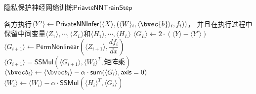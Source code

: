 %
\begin{algorithm}[h!]
\caption{隐私保护神经网络训练$\mathsf{PriavteNNTrainStep}$}
\label{alg:ss-perm:infer}
    \begin{algorithmic}[1]
    \State 各方执行$\langle Y' \rangle \gets \mathsf{PrivateNNInfer}(\langle X \rangle, (\langle W \rangle_i, \langle \bvec{b} \rangle_i, f_i))$，
        并且在执行过程中保留中间变量$\langle Z_1 \rangle, \cdots, \langle Z_L \rangle$和$\langle H_1 \rangle, \cdots, \langle H_L \rangle$
    \State $\langle G_L \rangle \gets 2 \cdot (\langle Y \rangle - \langle Y' \rangle)$
     
        \State $\langle G_{i + 1} \rangle \gets \mathsf{PermNonlinear}(\langle Z_{i+1} \rangle, \dfrac{df_i}{dx})$ 
        \State $\langle G_{i + 1} \rangle = \mathsf{SSMul}(\langle G_{i+1} \rangle, \langle W_i \rangle^T, \text{矩阵乘})$ 
        \State $\langle \bvec b_i \rangle \gets \langle \bvec b_i \rangle - \alpha \cdot \mathsf{sum}(\langle G_i \rangle, \mathsf{axis}=0)$ 
        \State $\langle W_i \rangle \gets \langle W_i \rangle - \alpha \cdot \mathsf{SSMul}(\langle H_i \rangle^T, \langle G_i \rangle)$
    \EndFor
\end{algorithmic}
\end{algorithm}

%